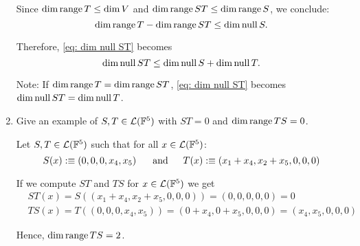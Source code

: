 \begin{xrcs}
\begin{enumerate}
{\begin{prf}
      Since $\dim \operatorname{range} T \leq \dim V$ and $\dim \operatorname{range} ST \leq \dim \operatorname{range} S$, we conclude:
      \begin{equation}
        \dim \operatorname{range} T - \dim \operatorname{range} ST \leq \dim \operatorname{null} S.
      \end{equation}

      Therefore, \eqref{eq: dim null ST} becomes
      \begin{equation}
        \dim \operatorname{null} ST \leq \dim \operatorname{null} S + \dim \operatorname{null} T.
      \end{equation}

      Note: If $\dim \operatorname{range} T = \dim \operatorname{range} ST$, \eqref{eq: dim null ST} becomes $\dim \operatorname{null} ST = \dim \operatorname{null} T$.
    \end{prf}
    }
    \item{
      Give an example of $S, T \in \mathcal{L}(\mathbb{F}^5)$ with $ST = 0$ and $\dim \operatorname{range} TS = 0$.

      Let $S, T \in \mathcal{L}(\mathbb{F}^5)$ such that for all $x \in \mathcal{L}(\mathbb{F}^5)$:
      \begin{equation}
        S(x) :\equiv (0,0,0,x_4,x_5) \quad \;\;\, \text{and}\;\; \quad T(x) :\equiv (x_1 + x_4, x_2 + x_5, 0,0,0)
      \end{equation}

      If we compute $ST$ and $TS$ for $x \in \mathcal{L}(\mathbb{F}^5)$ we get
      \begin{equation}
        \begin{aligned}
          &ST(x) = S((x_1 + x_4, x_2 + x_5, 0,0,0)) = (0,0,0,0,0) = 0 \\
          &TS(x) = T((0,0,0,x_4,x_5)) = (0+x_4, 0+x_5, 0,0,0) = (x_4, x_5, 0,0,0)
        \end{aligned}
      \end{equation}

      Hence, $\dim \operatorname{range} TS = 2$.
    }

  \end{enumerate}

\end{xrcs}

